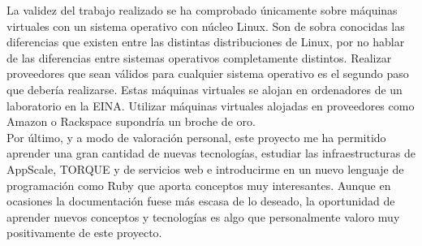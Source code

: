 La validez del trabajo realizado se ha comprobado únicamente sobre máquinas virtuales con un sistema operativo con núcleo Linux. Son de sobra conocidas las diferencias que existen entre las distintas distribuciones de Linux, por no hablar de las diferencias entre sistemas operativos completamente distintos. Realizar proveedores que sean válidos para cualquier sistema operativo es el segundo paso que debería realizarse. Estas máquinas virtuales se alojan en ordenadores de un laboratorio en la EINA. Utilizar máquinas virtuales alojadas en proveedores como Amazon o Rackspace supondría un broche de oro. \\

Por último, y a modo de valoración personal, este proyecto me ha permitido aprender una gran cantidad de nuevas tecnologías, estudiar las infraestructuras de AppScale, TORQUE y de servicios web e introducirme en un nuevo lenguaje de programación como Ruby que aporta conceptos muy interesantes. Aunque en ocasiones la documentación fuese más escasa de lo deseado, la oportunidad de aprender nuevos conceptos y tecnologías es algo que personalmente valoro muy positivamente de este proyecto.
